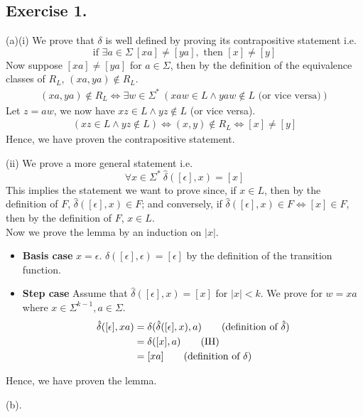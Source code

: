 \documentclass[12pt]{article}
\begin{document}
\subsection*{Exercise 1.}
\noindent (a)(i) We prove that \(\delta\) is well defined by proving its contrapositive statement i.e. 
\begin{equation*}
  \text{if } \exists a \in \Sigma \ [xa] \neq [ya], \text{ then } [x] \neq [y]
\end{equation*}
Now suppose \([xa] \neq [ya]\) for \(a \in \Sigma\), then by the definition of the equivalence classes of \(R_{L}\), \((xa, ya) \notin R_{L}\).
\begin{align*}
  (xa, ya) \notin R_{L} \Leftrightarrow \exists w \in \Sigma^{*}\ (xaw \in L \land yaw \notin L \text{ (or vice versa)})
\end{align*}
Let \(z = aw\), we now have \(xz \in L \land yz \notin L\) (or vice versa).
\begin{align*}
  (xz \in L \land yz \notin L) \Leftrightarrow (x, y) \notin R_{L} \Leftrightarrow [x] \neq [y]
\end{align*}
Hence, we have proven the contrapositive statement.

\noindent (ii) We prove a more general statement i.e. 
\begin{equation*}
  \forall x \in \Sigma^{*}\ \hat{\delta}([\epsilon], x) = [x] 
\end{equation*}
This implies the statement we want to prove since, if \(x \in L\), then by the definition of \(F\), \(\hat{\delta}([\epsilon], x) \in F\); and conversely, if \(\hat{\delta}([\epsilon], x) \in F \Leftrightarrow [x] \in F\), then by the definition of \(F\), \(x \in L\). \\
Now we prove the lemma by an induction on \(|x|\).
\begin{itemize}
  \item \textbf{Basis case} \(x = \epsilon\). \(\delta([\epsilon], \epsilon) = [\epsilon]\) by the definition of the transition function.
  \item \textbf{Step case} Assume that \(\hat{\delta}([\epsilon], x) = [x]\) for \(|x| < k\). We prove for \(w = xa\) where \(x \in \Sigma^{k-1}, a \in \Sigma\).
  \begin{align*}
    \hat{\delta}([\epsilon], xa) &= \delta(\hat{\delta}([\epsilon], x), a) \tag*{(definition of \(\hat{\delta}\))} \\
    &= \delta([x], a) \tag*{(IH)} \\
    &= [xa] \tag*{(definition of \(\delta\))}
  \end{align*}
\end{itemize}
Hence, we have proven the lemma.

\noindent (b).
\end{document}
